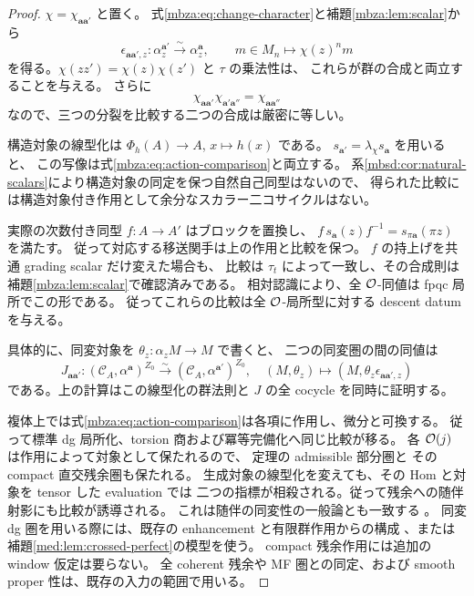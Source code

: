 \begin{proof}
$\chi=\chi_{\boldsymbol a\boldsymbol a'}$ と置く。
式\eqref{mbza:eq:change-character}と補題\ref{mbza:lem:scalar}から
\begin{equation}\label{mbza:eq:action-comparison}
 \epsilon_{\boldsymbol a\boldsymbol a',z}:
 \alpha_z^{\boldsymbol a'}\xrightarrow{\sim}\alpha_z^{\boldsymbol a},
 \qquad m\in M_n\longmapsto\chi(z)^n m
\end{equation}
を得る。$\chi(zz')=\chi(z)\chi(z')$ と $\tau$ の乗法性は、
これらが群の合成と両立することを与える。
さらに
\[
 \chi_{\boldsymbol a\boldsymbol a'}\chi_{\boldsymbol a'\boldsymbol a''}
   =\chi_{\boldsymbol a\boldsymbol a''}
\]
なので、三つの分裂を比較する二つの合成は厳密に等しい。

構造対象の線型化は $\Phi_h(A)\to A$, $x\mapsto h(x)$ である。
$s_{\boldsymbol a'}=\lambda_\chi s_{\boldsymbol a}$ を用いると、
この写像は式\eqref{mbza:eq:action-comparison}と両立する。
系\ref{mbsd:cor:natural-scalars}により構造対象の同定を保つ自然自己同型はないので、
得られた比較には構造対象付き作用として余分なスカラー二コサイクルはない。

実際の次数付き同型 $f:A\to A'$ はブロックを置換し、
$f\,s_{\boldsymbol a}(z)f^{-1}=s_{\pi\boldsymbol a}(\pi z)$ を満たす。
従って対応する移送関手は上の作用と比較を保つ。
$f$ の持上げを共通 grading scalar だけ変えた場合も、
比較は $\tau_t$ によって一致し、その合成則は補題\ref{mbza:lem:scalar}で確認済みである。
相対認識により、全 $\mathcal O$-同値は fpqc 局所でこの形である。
従ってこれらの比較は全 $\mathcal O$-局所型に対する descent datum を与える。

具体的に、同変対象を $\theta_z:\alpha_zM\to M$ で書くと、
二つの同変圏の間の同値は
\begin{equation}\label{mbza:eq:equivariant-change}
 J_{\boldsymbol a\boldsymbol a'}:
 (\mathcal C_A,\alpha^{\boldsymbol a})^{Z_0}
   \xrightarrow{\sim}(\mathcal C_A,\alpha^{\boldsymbol a'})^{Z_0},
 \quad
 (M,\theta_z)\longmapsto
 (M,\theta_z\epsilon_{\boldsymbol a\boldsymbol a',z})
\end{equation}
である。上の計算はこの線型化の群法則と $J$ の全 cocycle を同時に証明する。

複体上では式\eqref{mbza:eq:action-comparison}は各項に作用し、微分と可換する。
従って標準 dg 局所化、torsion 商および冪等完備化へ同じ比較が移る。
各 $\mathcal O(j)$ は作用によって対象として保たれるので、
定理の admissible 部分圏と
その compact 直交残余圏も保たれる。
生成対象の線型化を変えても、その Hom と対象を tensor した evaluation では
二つの指標が相殺される。従って残余への随伴射影にも比較が誘導される。
これは随伴の同変性の一般論とも一致する
\cite[Proposition~3.13, Theorem~6.2]{MBZAShinder}。
同変 dg 圏を用いる際には、既存の enhancement と有限群作用からの構成
\cite[Theorems~8.7, 8.9]{MEDElagin}、または
補題\ref{med:lem:crossed-perfect}の模型を使う。
compact 残余作用には追加の window 仮定は要らない。
全 coherent 残余や MF 圏との同定、および smooth proper 性は、既存の入力の範囲で用いる。
\end{proof}

